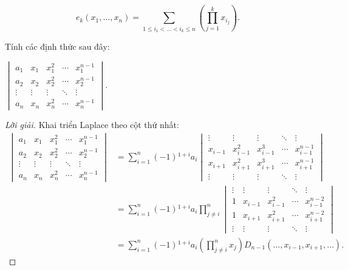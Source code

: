 \documentclass[class=linearalgebra,crop=false]{standalone}
\begin{document}
\[
    e_{k}(x_{1}, \ldots, x_{n}) = \sum_{1\le i_{1} < \ldots < i_{k} \le n}\left(\prod^{k}_{j=1}x_{i_{j}}\right).
\]

\par Tính các định thức sau đây:

\begin{exercise}
    $\begin{vmatrix}
            a_{1}  & x_{1}  & x_{1}^{2} & \cdots & x_{1}^{n-1} \\
            a_{2}  & x_{2}  & x_{2}^{2} & \cdots & x_{2}^{n-1} \\
            \vdots & \vdots & \vdots    & \ddots & \vdots      \\
            a_{n}  & x_{n}  & x_{n}^{2} & \cdots & x_{n}^{n-1}
        \end{vmatrix}$.
\end{exercise}

\begin{proof}[Lời giải]
    \par Khai triển Laplace theo cột thứ nhất:
    \begin{align*}
        \begin{vmatrix}
            a_{1}  & x_{1}  & x_{1}^{2} & \cdots & x_{1}^{n-1} \\
            a_{2}  & x_{2}  & x_{2}^{2} & \cdots & x_{2}^{n-1} \\
            \vdots & \vdots & \vdots    & \ddots & \vdots      \\
            a_{n}  & x_{n}  & x_{n}^{2} & \cdots & x_{n}^{n-1}
        \end{vmatrix}
         & =
        \sum^{n}_{i=1}(-1){}^{1+i}a_{i}
        \begin{vmatrix}
            \vdots  & \vdots      & \vdots      & \ddots & \vdots        \\
            x_{i-1} & x_{i-1}^{2} & x_{i-1}^{3} & \cdots & x_{i-1}^{n-1} \\
            x_{i+1} & x_{i+1}^{2} & x_{i+1}^{3} & \cdots & x_{i+1}^{n-1} \\
            \vdots  & \vdots      & \vdots      & \ddots & \vdots
        \end{vmatrix} \\
         & =
        \sum^{n}_{i=1}(-1){}^{1+i}a_{i}\prod^{n}_{j\ne i}
        \begin{vmatrix}
            \vdots & \vdots  & \vdots      & \ddots & \vdots        \\
            1      & x_{i-1} & x_{i-1}^{2} & \cdots & x_{i-1}^{n-2} \\
            1      & x_{i+1} & x_{i+1}^{2} & \cdots & x_{i+1}^{n-2} \\
            \vdots & \vdots  & \vdots      & \ddots & \vdots
        \end{vmatrix}      \\
         & =
        \sum^{n}_{i=1}(-1){}^{1+i}a_{i}\left(\prod^{n}_{j\ne i}x_{j}\right)
        D_{n-1}(\ldots, x_{i-1}, x_{i+1}, \ldots).
    \end{align*}
\end{proof}
\end{document}
